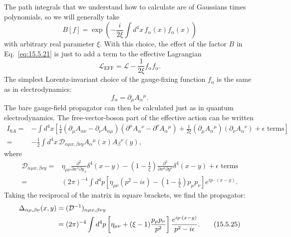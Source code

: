 The path integrals that we understand how to calculate are of Gaussians times
polynomials, so we will generally take
\begin{equation}
  B[f]=\exp\left(-\frac{i}{2\xi}\int d^4x\,f_\alpha(x)f_\alpha(x)\right)
  \tag{15.5.22}\label{eq:15.5.22}
\end{equation}
with arbitrary real parameter $\xi$. With this choice, the effect of the factor
$B$ in Eq.~\eqref{eq:15.5.21} is just to add a term to the effective Lagrangian
\begin{equation}
  \mathcal L_{\mathrm{EFF}}=\mathcal L-\frac{1}{2\xi}f_\alpha f_\alpha.
  \tag{15.5.23}\label{eq:15.5.23}
\end{equation}
The simplest Lorentz-invariant choice of the gauge-fixing function $f_\alpha$
is the same as in electrodynamics:
\begin{equation}
  f_\alpha=\partial_\mu A_\alpha{}^\mu.
  \tag{15.5.24}\label{eq:15.5.24}
\end{equation}
The bare gauge-field propagator can then be calculated just as in quantum
electrodynamics. The free-vector-boson part of the effective action can be
written
\begin{align*}
  I_{0A}={}&-\int d^4x\left[\frac14
  (\partial_\mu A_{\alpha\nu}-\partial_\nu A_{\alpha\mu})
  (\partial^\mu A_\alpha{}^\nu-\partial^\nu A_\alpha{}^\mu)
  +\frac{1}{2\xi}(\partial_\mu A_\alpha{}^\mu)
  (\partial_\nu A_\alpha{}^\nu)+\epsilon\text{ terms}\right]
  \\
  ={}&-\frac12\int d^4x\,
  \mathcal D_{\alpha\mu x,\beta\nu y}A_\alpha{}^\mu(x)A_\beta{}^\nu(y),
\end{align*}
where
\begin{align*}
  \mathcal D_{\alpha\mu x,\beta\nu y}
  ={}&\eta_{\mu\nu}\frac{\partial^2}{\partial x^\lambda\partial y_\lambda}
  \delta^4(x-y)
  -\left(1-\frac1\xi\right)
  \frac{\partial^2}{\partial x^\mu\partial y^\nu}\delta^4(x-y)
  +\epsilon\text{ terms}
  \\
  ={}&(2\pi)^{-4}\int d^4p\left[\eta_{\mu\nu}(p^2-i\epsilon)
  -\left(1-\frac1\xi\right)p_\mu p_\nu\right]e^{ip\cdot(x-y)}.
\end{align*}
Taking the reciprocal of the matrix in square brackets, we find the propagator:
\begin{align}
  \Delta_{\alpha\mu,\beta\nu}(x,y)
  &=(\mathcal D^{-1})_{\alpha\mu x,\beta\nu y}
  \notag\\
  &=(2\pi)^{-4}\int d^4p\left[\eta_{\mu\nu}
  +(\xi-1)\frac{p_\mu p_\nu}{p^2}\right]
 \frac{e^{ip\cdot(x-y)}}{p^2-i\epsilon}.
  \tag{15.5.25}\label{eq:15.5.25}
\end{align}

